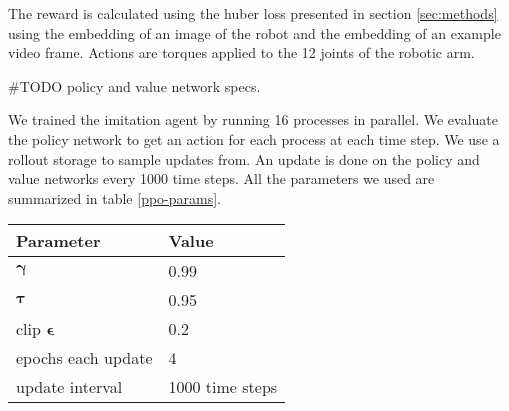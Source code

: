 The reward is calculated using the huber loss presented in section \ref{sec:methods} using the embedding of an image of the robot and the embedding of an example video frame. Actions are torques applied to the 12 joints of the robotic arm.

\#TODO policy and value network specs.

We trained the imitation agent by running 16 processes in parallel. We evaluate the policy network to get an action for each process at each time step. We use a rollout storage to sample updates from. An update is done on the policy and value networks every 1000 time steps. All the parameters we used are summarized in table \ref{ppo-params}.

{
    \vspace{0.5cm}
    \centering
    \begin{tabular}{@{}ll@{}}
    \toprule
    \textbf{Parameter}             & \textbf{Value}    \\ \midrule
    $\boldsymbol{\gamma}$        & 0.99                \\
    $\boldsymbol{\tau}$        & 0.95                \\
    clip $\boldsymbol{\epsilon}$        & 0.2                \\
    epochs each update        & 4                \\
    update interval        & 1000 time steps                \\
    \end{tabular}
    \label{ppo-params}
}
